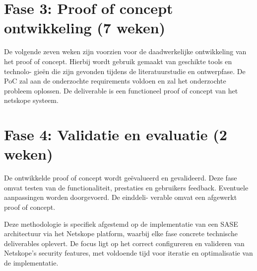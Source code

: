 \section{Fase 3: Proof of concept ontwikkeling (7 weken)}
De volgende zeven weken zijn voorzien voor de daadwerkelijke ontwikkeling van het
proof of concept. Hierbij wordt gebruik gemaakt van geschikte tools en technolo-
gieën die zijn gevonden tijdens de literatuurstudie en ontwerpfase. De PoC zal aan de onderzochte requirements voldoen en zal het onderzochte probleem oplossen. De deliverable is een functioneel proof of concept van het netskope systeem.

\section{Fase 4: Validatie en evaluatie (2 weken)}
De ontwikkelde proof of concept wordt geëvalueerd en gevalideerd. Deze fase omvat testen van de functionaliteit, prestaties en
gebruikers feedback. Eventuele aanpassingen worden doorgevoerd. De einddeli-
verable omvat een afgewerkt proof of concept.

Deze methodologie is specifiek afgestemd op de implementatie van een SASE architectuur via het Netskope platform, waarbij elke fase concrete technische deliverables oplevert. De focus ligt op het correct configureren en valideren van Netskope's security features, met voldoende tijd voor iteratie en optimalisatie van de implementatie.

